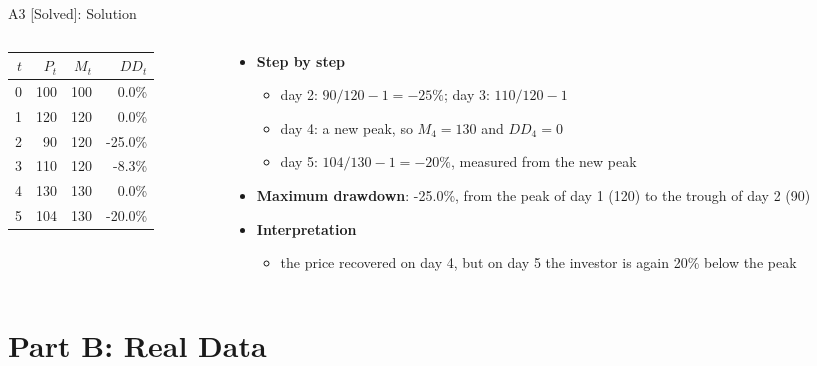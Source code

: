 \begin{frame}{A3 [Solved]: Solution}
\itemsize{\small}
\begin{columns}[T]
\begin{column}{0.38\textwidth}
\begin{center}
\footnotesize
\begin{tabular}{rrrr}
\toprule
$t$ & $P_t$ & $M_t$ & $DD_t$ \\
\midrule
0 & 100 & 100 & 0.0\% \\
1 & 120 & 120 & 0.0\% \\
2 & 90 & 120 & -25.0\% \\
3 & 110 & 120 & -8.3\% \\
4 & 130 & 130 & 0.0\% \\
5 & 104 & 130 & -20.0\% \\
\bottomrule
\end{tabular}
\end{center}

\end{column}
\begin{column}{0.58\textwidth}
\begin{itemize}
    \item \textbf{Step by step}
    \begin{itemize}
        \item day 2: $90/120 - 1 = -25\%$; day 3: $110/120 - 1$
        \item day 4: a new peak, so $M_4 = 130$ and $DD_4 = 0$
        \item day 5: $104/130 - 1 = -20\%$, measured from the new peak
    \end{itemize}
    \item \textbf{Maximum drawdown}: -25.0\%, from the peak of day 1 (120) to the trough of day 2 (90)
    \item \textbf{Interpretation}
    \begin{itemize}
        \item the price recovered on day 4, but on day 5 the investor is again 20\% below the peak
    \end{itemize}
\end{itemize}
\end{column}
\end{columns}
\end{frame}


\section{Part B: Real Data}

